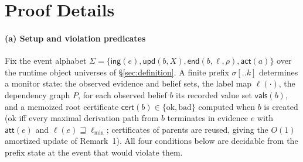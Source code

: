 \documentclass[conference,compsoc]{IEEEtran}
\theoremstyle{definition}
\theoremstyle{plain}
\newcommand{\att}{\ensuremath{\mathsf{att}}}
\newcommand{\cert}{\ensuremath{\mathsf{cert}}}
\newcommand{\vals}{\ensuremath{\mathsf{vals}}}
\newcommand{\ev}[1]{\ensuremath{\mathsf{#1}}}
\newcommand{\lmin}{\ensuremath{\ell_{\min}}}
\begin{document}
\appendices
\section{Proof Details}
\label{app:proofs}

\paragraph{(a) Setup and violation predicates}
Fix the event alphabet
$\Sigma = \{\ev{ing}(e), \ev{upd}(b, X), \ev{end}(b, \ell, \rho), \ev{act}(a)\}$
over the runtime object universes of \S\ref{sec:definition}. A
finite prefix $\sigma[..k]$ determines a monitor state: the
observed evidence and belief sets, the label map $\ell(\cdot)$,
the dependency graph $P$, for each observed belief $b$ its recorded
value set $\vals(b)$, and a memoized root certificate $\cert(b) \in \{\mathrm{ok}, \mathrm{bad}\}$
computed when $b$ is created ($\mathrm{ok}$ iff every maximal
derivation path from $b$ terminates in evidence $e$ with $\att(e)$
and $\ell(e) \sqsupseteq \lmin$; certificates of parents are
reused, giving the $O(1)$ amortized update of Remark~1). All four
conditions below are decidable from the prefix state at the event
that would violate them.
\end{document}
